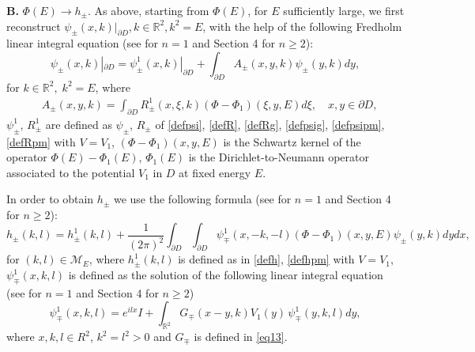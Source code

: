 \documentclass[11pt,a4paper,english,subeqn]{amsart}
\theoremstyle{plain}
\theoremstyle{definition}
\numberwithin{equation}{section}
\begin{document}
{\bf B.} $\Phi(E) \longrightarrow h_{\pm}$. 
As above, starting from $\Phi(E)$, for $E$ sufficiently large, we first reconstruct $\psi_{\pm}(x,k)|_{\partial D}, k \in {\mathbb{R}}^2, k^2 =E$, with the help of the following Fredholm linear integral equation (see \cite{N5} for $n=1$ and Section 4 for $n\geq 2$):
\begin{equation}\label{eqa11}
\psi_{\pm}(x,k)|_{\partial D}=\psi^1_{\pm}(x,k)|_{\partial D} +\int_{\partial D} A_{\pm}(x,y,k)\psi_{\pm}(y,k) dy,
\end{equation}
for $k \in {\mathbb{R}}^2, \; k^2 = E$, where
\begin{align} \label{eqa12}
&A_{\pm}(x,y,k)=\int_{\partial D} R^1_{\pm}(x,\xi,k) \left(\Phi - \Phi_1 \right)(\xi,y,E) d\xi, \quad x,y \in \partial D,
\end{align}
$\psi^1_{\pm}$, $R^1_{\pm}$ are defined as $\psi_{\pm}$, $R_{\pm}$ of \eqref{defpsi}, \eqref{defR}, \eqref{defRg}, \eqref{defpsig}, \eqref{defpsipm}, \eqref{defRpm} with $V = V_1$, $(\Phi-\Phi_1)(x,y,E)$ is the Schwartz kernel of the operator $\Phi(E)-\Phi_1(E)$, $\Phi_1(E)$ is the Dirichlet-to-Neumann operator associated to the potential $V_1$ in $D$ at fixed energy $E$.

In order to obtain $h_{\pm}$ we use the following formula (see \cite{N5} for $n=1$ and Section 4 for $n\geq 2$):
\begin{equation} \label{recah}
h_{\pm}(k,l) = h^1_{\pm}(k,l) + \frac{1}{(2 \pi)^2} \int_{\partial D} \int_{\partial D}\psi^1_{\mp}(x,-k,-l)(\Phi-\Phi_1)(x,y,E)\psi_{\pm}(y,k)dy dx,
\end{equation}
for $(k,l) \in {\mathscr{M}_E}$, where $h^1_{\pm}(k,l)$ is defined as in \eqref{defh}, \eqref{defhpm} with $V=V_1$, $\psi^1_{\mp}(x,k,l)$ is defined as the solution of the following linear integral equation (see \cite{N5} for $n=1$ and Section 4 for $n\geq 2$)
\begin{equation} \label{pssii}
\psi^1_{\mp}(x,k,l) = e^{ilx}I + \int_{{\mathbb{R}}^2}G_{\mp} (x-y,k) V_1(y) \, \psi^1_{\mp}(y,k,l)dy,
\end{equation}
where $x,k,l \in R^2$, $k^2 = l^2 > 0$ and $G_{\mp}$ is defined in \eqref{eq13}.\smallskip
\end{document}
